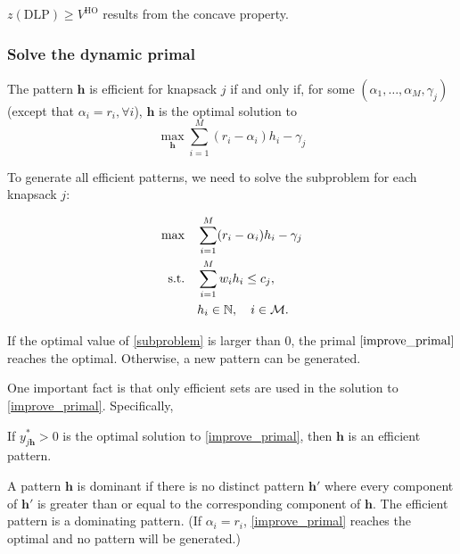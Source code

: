 

\begin{lem}\label{concave}
$z(\text{DLP}) \geq V^{\text{HO}}$ results from the concave property. 
\end{lem}


\subsubsection{Solve the dynamic primal}

The pattern $\bm{h}$ is efficient for knapsack $j$ if and only if, for some $(\alpha_{1}, \ldots, \alpha_{M}, \gamma_{j})$ (except that $\alpha_{i} = r_i, \forall i$), $\bm{h}$ is the optimal solution to $$\max_{\bm{h}} \sum_{i=1}^{M} (r_i - \alpha_{i}) h_{i} - \gamma_{j}$$

To generate all efficient patterns, we need to solve the subproblem for each knapsack $j$:

\begin{align}\label{subproblem}
    \max \quad & \sum_{i=1}^{M} (r_i - \alpha_{i}) h_{i} - \gamma_{j} \\
    \text {s.t.} \quad & \sum_{i= 1}^{M} w_{i} h_{i} \leq c_j, \notag \\
    & h_{i} \in \mathbb{N}, \quad i \in \mathcal{M}. \notag
\end{align} 

If the optimal value of \eqref{subproblem} is larger than $0$, the primal $\eqref{improve_primal}$ reaches the optimal. Otherwise, a new pattern can be generated.

One important fact is that only efficient sets are used in the solution to \eqref{improve_primal}. Specifically, 

\begin{lem}\label{efficient}
    If $y_{j \bm{h}}^{*} > 0$ is the optimal solution to \eqref{improve_primal}, then $\bm{h}$ is an efficient pattern.
\end{lem}


A pattern $\bm{h}$ is dominant if there is no distinct pattern $\bm{h}{'}$ where every component of $\bm{h}{'}$ is greater than or equal to the corresponding component of $\bm{h}$. The efficient pattern is a dominating pattern. (If $\alpha_{i} = r_i$, \eqref{improve_primal} reaches the optimal and no pattern will be generated.)

